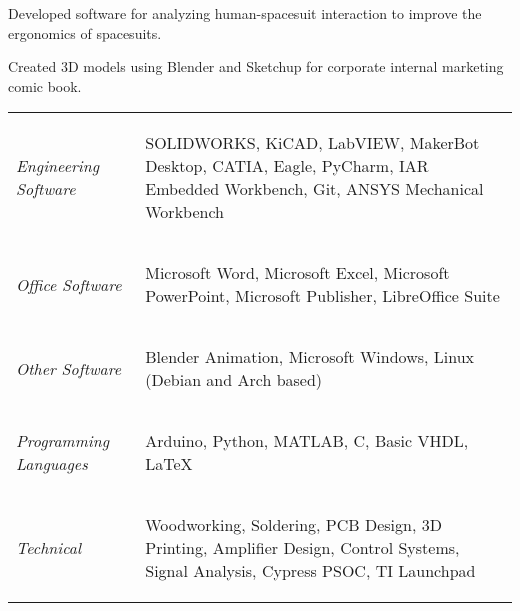 \documentclass[letterpaper,ddMMMyyyy,nonstopmode]{simpleresumecv}
\newcommand{\descriptionWidth}{33em}
\newcommand{\tableWidth}{23.5em}
\newenvironment{Description}
{%
	\SmallGap
	\par
	\begin{Detail}
		\Item
		\begin{minipage}{\descriptionWidth}
}
{\par
\end{minipage}
\end{Detail}
}
\begin{document}
\begin{Body}

            \begin{Description}
                Developed software for analyzing human-spacesuit interaction to improve the ergonomics of spacesuits.
            \end{Description}
            \Gap


            \begin{Description}
                    Created 3D models using Blender and Sketchup for corporate internal marketing comic book.

            \end{Description}



		\Gap
            \def\arraystretch{0}%
            \hspace*{-0.8em}
            \begin{tabular}[t]{p{11em} p{\tableWidth}}
                \textit{Engineering Software} &
                \begin{Detail}
                    SOLIDWORKS, KiCAD, LabVIEW, MakerBot Desktop, CATIA, Eagle, PyCharm, IAR Embedded Workbench, Git, ANSYS Mechanical Workbench
                \end{Detail}\\
                \textit{Office Software} &
                \begin{Detail}
                    Microsoft Word, Microsoft Excel, Microsoft PowerPoint, Microsoft Publisher, LibreOffice Suite
                \end{Detail}\\
                \textit{Other Software}&
                \begin{Detail}
                    Blender Animation, Microsoft Windows, Linux (Debian and Arch based)
                \end{Detail}\\
                \textit{Programming Languages} &
                \begin{Detail}
                    Arduino, Python, MATLAB, C, Basic VHDL, LaTeX
                \end{Detail}\\
                \textit{Technical}&
                \begin{Detail}
                    Woodworking, Soldering, PCB Design, 3D Printing, Amplifier Design, Control Systems, Signal Analysis, Cypress PSOC, TI Launchpad
                \end{Detail}
                \vspace{-1em}


\end{tabular}
\end{Body}
\end{document}
